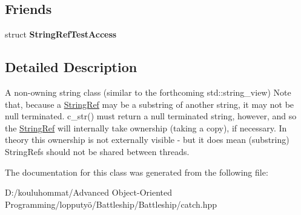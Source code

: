 \subsection*{Friends}
\begin{DoxyCompactItemize}
\item 
\mbox{\label{class_catch_1_1_string_ref_a420e64e1652de1b0d427775781b018f5}} 
struct {\bfseries String\+Ref\+Test\+Access}
\end{DoxyCompactItemize}


\subsection{Detailed Description}
A non-\/owning string class (similar to the forthcoming std\+::string\+\_\+view) Note that, because a \mbox{\hyperlink{class_catch_1_1_string_ref}{String\+Ref}} may be a substring of another string, it may not be null terminated. c\+\_\+str() must return a null terminated string, however, and so the \mbox{\hyperlink{class_catch_1_1_string_ref}{String\+Ref}} will internally take ownership (taking a copy), if necessary. In theory this ownership is not externally visible -\/ but it does mean (substring) String\+Refs should not be shared between threads. 

The documentation for this class was generated from the following file\+:\begin{DoxyCompactItemize}
\item 
D\+:/kouluhommat/\+Advanced Object-\/\+Oriented Programming/lopputyö/\+Battleship/\+Battleship/catch.\+hpp\end{DoxyCompactItemize}
